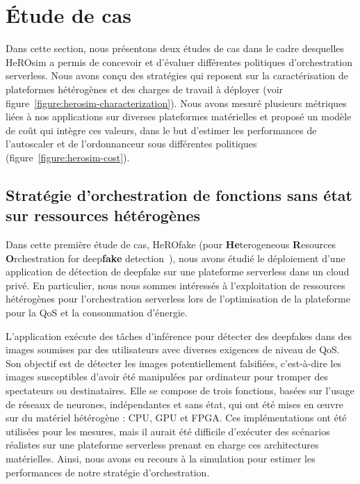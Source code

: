 \section{Étude de cas}
\label{section:herosim-case-study}


Dans cette section, nous présentons deux études de cas dans le cadre desquelles HeROsim a permis de concevoir et d'évaluer différentes politiques d'orchestration serverless. Nous avons conçu des stratégies qui reposent sur la caractérisation de plateformes hétérogènes et des charges de travail à déployer (voir figure~\ref{figure:herosim-characterization}). Nous avons mesuré plusieurs métriques liées à nos applications sur diverses plateformes matérielles et proposé un modèle de coût qui intègre ces valeurs, dans le but d'estimer les performances de l'autoscaler et de l'ordonnanceur sous différentes politiques (figure~\ref{figure:herosim-cost}).

\subsection{Stratégie d'orchestration de fonctions sans état sur ressources hétérogènes}

Dans cette première étude de cas, HeROfake (pour \textbf{He}terogeneous \textbf{R}esources \textbf{O}rchestration for deep\textbf{fake} detection~\cite{herofake}), nous avons étudié le déploiement d'une application de détection de deepfake sur une plateforme serverless dans un cloud privé. En particulier, nous nous sommes intéressés à l'exploitation de ressources hétérogènes pour l'orchestration serverless lors de l'optimisation de la plateforme pour la \gls{QoS} et la consommation d'énergie.

L'application exécute des tâches d'inférence pour détecter des deepfakes dans des images soumises par des utilisateurs avec diverses exigences de niveau de \gls{QoS}. Son objectif est de détecter les images potentiellement falsifiées, c'est-à-dire les images susceptibles d'avoir été manipulées par ordinateur pour tromper des spectateurs ou destinataires. Elle se compose de trois fonctions, basées sur l'usage de réseaux de neurones, indépendantes et sans état, qui ont été mises en œuvre sur du matériel hétérogène : \gls{CPU}, \gls{GPU} et \gls{FPGA}. Ces implémentations ont été utilisées pour les mesures, mais il aurait été difficile d'exécuter des scénarios réalistes sur une plateforme serverless prenant en charge ces architectures matérielles. Ainsi, nous avons eu recours à la simulation pour estimer les performances de notre stratégie d'orchestration.

